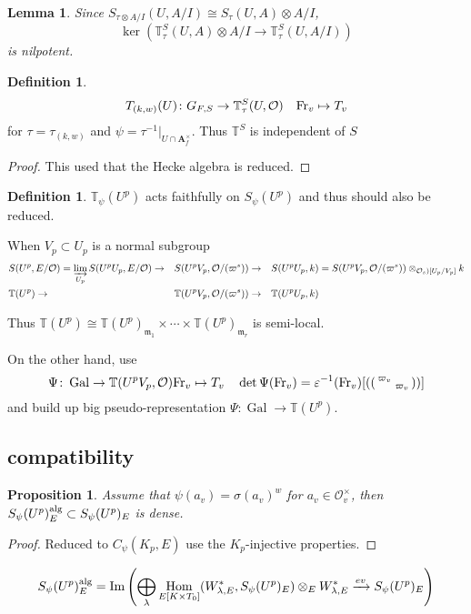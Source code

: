 \documentclass[leqno]{amsart}
\newcommand{\smat}[1]{\left( \begin{smallmatrix} #1 \end{smallmatrix} \right)}
\newcommand{\TT}{\mathbb{T}} %
\newcommand{\Fr}{\textnormal{Fr}} %
\DeclareMathOperator{\Gal}{Gal}
\newcommand{\alg}{\textnormal{alg}}
\newcommand{\A}{\mathbf A}
\newcommand{\oo}{\mathcal{O}} %
\newcommand{\fm}{\mathfrak{m}}
\DeclareMathOperator{\Hom}{Hom}
\DeclareMathOperator{\Image}{Im}
\newtheorem{lem}[thm]{Lemma}
\newtheorem{prop}[thm]{Proposition}
\theoremstyle{definition}
\newtheorem{defn}[thm]{Definition}
\theoremstyle{remark}
\begin{document}
\begin{lem}
	Since 
 $S_{\tau\otimes A/I}(U, A/I)\cong S_{\tau}(U, A)\otimes A/I$,
 \[
	 \ker(\TT_{\tau}^S(U,A)\otimes A/I\to \TT_{\tau}^S(U,A/I))
 \]
 is nilpotent.
\end{lem}

\begin{defn}
	\[
		T_{(k,w)}(U)\colon G_{F,S}\to \TT^S_{\tau}
		(U,\oo)\quad
		\Fr_v\mapsto T_v
	\]
	for $\tau=\tau_{(k,w)}$
	and $\psi=\tau^{-1}\vert_{U\cap \A_f^\times}$.
	Thus  $\TT^S$ is independent of  $S$
\end{defn}
\begin{proof}
	This used that the Hecke algebra is reduced.
\end{proof}

\begin{defn}
	$\TT_\psi(U^p)$ acts faithfully on  $S_\psi(U^p)$
	and thus should also be reduced.
\end{defn}

When $V_p\subset U_p$ is a normal subgroup
\begin{align*}
&S(U^p,E/\oo)=\varinjlim_{U_p} S(U^pU_p, E/\oo)\to&
&S(U^pV_p,\oo/(\varpi^s))\to&
&S(U^pU_p,k)=
S(U^pV_p,\oo/(\varpi^s))\otimes_{\oo_s)[U_p/V_p]}k\\
&\TT(U^p)\to&
&\TT(U^pV_p,\oo/(\varpi^s))\to&
&\TT(U^pU_p,k)
\end{align*}

Thus
$\TT(U^p)\cong\TT(U^p)_{\fm_1}\times\cdots
\times \TT(U^p)_{\fm_r}$
is semi-local.

On the other hand, use
\[
	\Psi\colon \Gal\to \TT(U^pV_p,\oo)
	\Fr_v\mapsto T_v\quad
	\det\Psi(\Fr_v)=\varepsilon^{-1}(\Fr_v)
	[(\smat{\varpi_v&\\&\varpi_v})]
\]
and build up big pseudo-representation
$\Psi\colon \Gal\to \TT(U^p)$.

\subsection{compatibility}

\begin{prop}
Assume that $\psi(a_v)=\sigma(a_v)^w$
for  $a_v\in \oo_v^\times$,
then $S_\psi(U^p)_E^{\alg}\subset S_\psi(U^p)_E$
is dense.
\end{prop}
\begin{proof}
	Reduced to $C_\psi(K_p,E)$ use the  $K_p$-injective properties.
\end{proof}
\[
S_\psi(U^p)_E^{\alg}=
\Image\left(
	\bigoplus_{\lambda}\Hom_{E[K\times T_0]}(W_{\lambda,E}^*, 
	S_\psi(U^p)_E)
	\otimes_EW_{\lambda,E}^*\xrightarrow{ev}
	S_\psi(U^p)_E
\right)
\]
\end{document}
